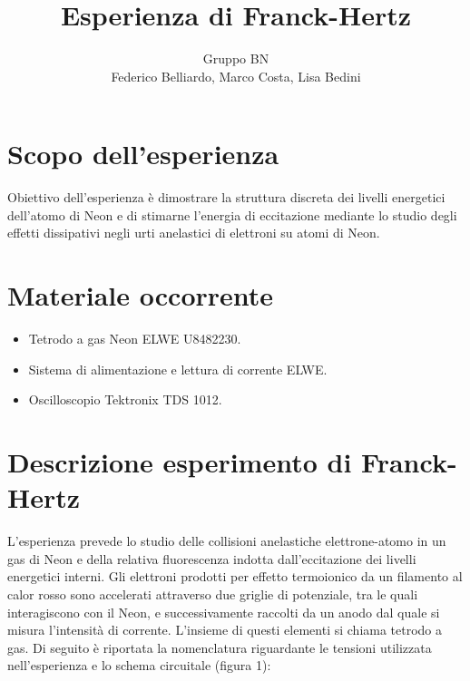 \documentclass[10pt,a4paper]{article}
\author{Gruppo BN \\ Federico Belliardo, Marco Costa, Lisa Bedini}
\title{Esperienza di Franck-Hertz}
\begin{document}
\maketitle
\section{Scopo dell'esperienza}
Obiettivo dell'esperienza è dimostrare la struttura discreta dei livelli energetici dell'atomo di Neon e di stimarne l'energia di eccitazione mediante lo studio degli effetti dissipativi negli urti anelastici di elettroni su atomi di Neon.\\

\section{Materiale occorrente}
\begin{itemize}
\item Tetrodo a gas Neon ELWE U8482230.
\item Sistema di alimentazione e lettura di corrente ELWE.
\item Oscilloscopio Tektronix TDS 1012.
\end{itemize}

\section{Descrizione esperimento di Franck-Hertz}
L'esperienza prevede lo studio delle collisioni anelastiche elettrone-atomo in un gas di Neon e della relativa fluorescenza indotta dall'eccitazione dei livelli energetici interni. Gli elettroni prodotti per effetto termoionico da un filamento al calor rosso sono accelerati attraverso due griglie di potenziale, tra le quali interagiscono con il Neon, e successivamente raccolti da un anodo dal quale si misura l'intensità di corrente. L'insieme di questi elementi si chiama tetrodo a gas.
Di seguito è riportata la nomenclatura riguardante le tensioni utilizzata nell'esperienza e lo schema circuitale (figura 1):
\end{document}
